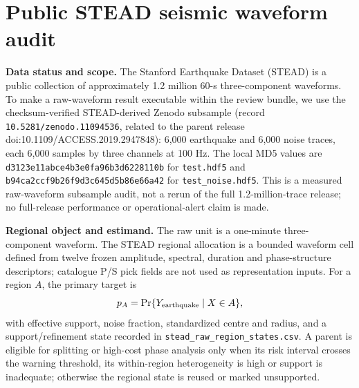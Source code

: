 \documentclass[11pt,a4paper]{article}
\numberwithin{equation}{section}
\theoremstyle{definition}\newtheorem{definition}[theorem]{Definition}
\theoremstyle{remark}\newtheorem{remark}[theorem]{Remark}
\begin{document}
\section{Public STEAD seismic waveform audit}\label{sec:stead}
\textbf{Data status and scope.} The Stanford Earthquake Dataset (STEAD) is a public collection of approximately 1.2 million 60-s three-component waveforms. To make a raw-waveform result executable within the review bundle, we use the checksum-verified STEAD-derived Zenodo subsample (record \texttt{10.5281/zenodo.11094536}, related to the parent release doi:10.1109/ACCESS.2019.2947848): 6,000 earthquake and 6,000 noise traces, each 6,000 samples by three channels at 100 Hz. The local MD5 values are \texttt{d3123e11abce4b3e0fa96b3d6228110b} for \texttt{test.hdf5} and \texttt{b94ca2ccf9b26f9d3c645d5b86e66a42} for \texttt{test\_noise.hdf5}. This is a measured raw-waveform subsample audit, not a rerun of the full 1.2-million-trace release; no full-release performance or operational-alert claim is made.

\textbf{Regional object and estimand.} The raw unit is a one-minute three-component waveform. The STEAD regional allocation is a bounded waveform cell defined from twelve frozen amplitude, spectral, duration and phase-structure descriptors; catalogue P/S pick fields are not used as representation inputs. For a region $A$, the primary target is
\[
 p_A=\Pr\{Y_{\rm earthquake}\mid X\in A\},
\]
with effective support, noise fraction, standardized centre and radius, and a support/refinement state recorded in \texttt{stead\_raw\_region\_states.csv}. A parent is eligible for splitting or high-cost phase analysis only when its risk interval crosses the warning threshold, its within-region heterogeneity is high or support is inadequate; otherwise the regional state is reused or marked unsupported.
\end{document}
